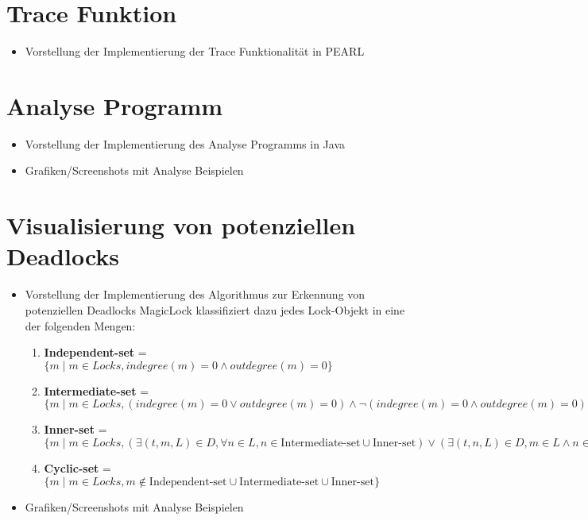 \section{Trace Funktion}
\label{section:Implementierung:Trace Funktion}
\begin{itemize}
  \item Vorstellung der Implementierung der Trace Funktionalität in PEARL
\end{itemize}

\section{Analyse Programm}
\label{section:Implementierung:Analyse Programm}
\begin{itemize}
  \item Vorstellung der Implementierung des Analyse Programms in Java
  \item Grafiken/Screenshots mit Analyse Beispielen
\end{itemize}

\section{Visualisierung von potenziellen Deadlocks}
\label{section:Implementierung:Visualisierung von potenziellen Deadlocks}
\begin{itemize}
  \item Vorstellung der Implementierung des Algorithmus zur Erkennung von
  potenziellen Deadlocks
  MagicLock klassifiziert dazu jedes Lock-Objekt in eine der folgenden Mengen:
  \begin{enumerate}
    \item \textbf{Independent-set} = $\{m \mid m \in Locks, indegree(m) = 0 \land outdegree(m) = 0\}$
    \item \textbf{Intermediate-set} = $\{m \mid m \in Locks, (indegree(m) = 0 \lor outdegree(m) = 0) \land \lnot (indegree(m) = 0 \land outdegree(m) = 0)\}$
    \item \textbf{Inner-set} = $\{m \mid m \in Locks, (\exists (t,m,L) \in D, \forall n \in L, n \in \text{Intermediate-set} \cup \text{Inner-set}) \lor (\exists (t,n,L) \in D, m \in L \land n \in \text{Intermediate-set} \cup \text{Inner-set})\}$
    \item \textbf{Cyclic-set} = $\{m \mid m \in Locks, m \notin \text{Independent-set} \cup \text{Intermediate-set} \cup \text{Inner-set}\}$
  \end{enumerate}
  \item Grafiken/Screenshots mit Analyse Beispielen
\end{itemize}